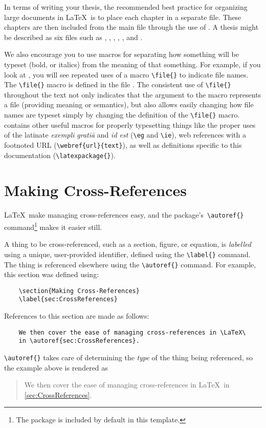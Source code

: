 In terms of writing your thesis, the recommended best practice for
organizing large documents in \LaTeX\ is to place each chapter in
a separate file.  These chapters are then included from the main
file through the use of \verb++.  A thesis might
be described as six files such as ,
, , ,
, and .

We also encourage you to use macros for separating how something
will be typeset (\eg bold, or italics) from the meaning of that
something. 
For example, if you look at , you will see repeated
uses of a macro \verb+\file{}+ to indicate file names.
The \verb+\file{}+ macro is defined in the file .
The consistent use of \verb+\file{}+ throughout the text not only
indicates that the argument to the macro represents a file (providing
meaning or semantics), but also allows easily changing how
file names are typeset simply by changing the definition of the
\verb+\file{}+ macro.
 contains other useful macros for properly typesetting
things like the proper uses of the latinate \emph{exempli grati\={a}}
and \emph{id est} (\ie \verb+\eg+ and \verb+\ie+), 
web references with a footnoted \acs{URL} (\verb+\webref{url}{text}+),
as well as definitions specific to this documentation
(\verb+\latexpackage{}+).

\section{Making Cross-References}
\label{sec:CrossReferences}

\LaTeX\ make managing cross-references easy, and the 
package's\ \verb+\autoref{}+ command\footnote{%
    The  package is included by default in this
    template.}
makes it easier still. 

A thing to be cross-referenced, such as a section, figure, or equation,
is \emph{labelled} using a unique, user-provided identifier, defined
using the \verb+\label{}+ command.  
The thing is referenced elsewhere using the \verb+\autoref{}+ command.
For example, this section was defined using:
\begin{lstlisting}
    \section{Making Cross-References}
    \label{sec:CrossReferences}
\end{lstlisting}
References to this section are made as follows:
\begin{lstlisting}
    We then cover the ease of managing cross-references in \LaTeX\
    in \autoref{sec:CrossReferences}.
\end{lstlisting}
\verb+\autoref{}+ takes care of determining the \emph{type} of the 
thing being referenced, so the example above is rendered as
\begin{quote}
    We then cover the ease of managing cross-references in \LaTeX\
    in \autoref{sec:CrossReferences}.
\end{quote}

